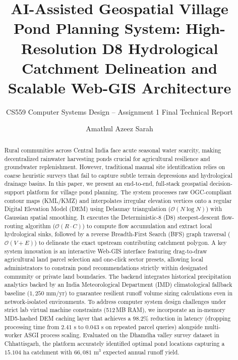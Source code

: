 \documentclass[manuscript,screen]{acmart}
\begin{document}
\title{AI-Assisted Geospatial Village Pond Planning System: High-Resolution D8 Hydrological Catchment Delineation and Scalable Web-GIS Architecture}
\subtitle{CS559 Computer Systems Design -- Assignment 1 Final Technical Report}

\author{Amathul Azeez Sarah}

\renewcommand{\shortauthors}{Sarah}

\begin{abstract}
Rural communities across Central India face acute seasonal water scarcity, making decentralized rainwater harvesting ponds crucial for agricultural resilience and groundwater replenishment. However, traditional manual site identification relies on coarse heuristic surveys that fail to capture subtle terrain depressions and hydrological drainage basins. In this paper, we present an end-to-end, full-stack geospatial decision-support platform for village pond planning. The system processes raw OGC-compliant contour maps (KML/KMZ) and interpolates irregular elevation vertices onto a regular Digital Elevation Model (DEM) using Delaunay triangulation ($\mathcal{O}(N \log N)$) with Gaussian spatial smoothing. It executes the Deterministic-8 (D8) steepest-descent flow-routing algorithm ($\mathcal{O}(R \cdot C)$) to compute flow accumulation and extract local hydrological sinks, followed by a reverse Breadth-First Search (BFS) graph traversal ($\mathcal{O}(V + E)$) to delineate the exact upstream contributing catchment polygon. A key system innovation is an interactive Web-GIS interface featuring drag-to-draw agricultural land parcel selection and one-click sector presets, allowing local administrators to constrain pond recommendations strictly within designated community or private land boundaries. The backend integrates historical precipitation analytics backed by an India Meteorological Department (IMD) climatological fallback baseline ($1,250\text{ mm/yr}$) to guarantee resilient runoff volume sizing calculations even in network-isolated environments. To address computer system design challenges under strict lab virtual machine constraints (512\,MB RAM), we incorporate an in-memory MD5-hashed DEM caching layer that achieves a 98.2\% reduction in latency (dropping processing time from $2.41\text{ s}$ to $0.043\text{ s}$ on repeated parcel queries) alongside multi-worker ASGI process scaling. Evaluated on the Dhamdha valley survey dataset in Chhattisgarh, the platform accurately identified optimal pond locations capturing a $15.104\text{ ha}$ catchment with $66,081\text{ m}^3$ expected annual runoff yield.
\end{abstract}
\end{document}
